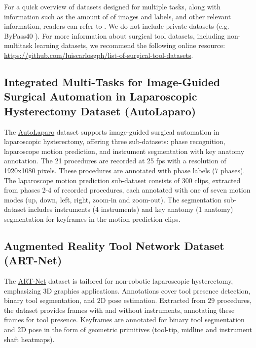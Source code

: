 For a quick overview of datasets designed for multiple tasks, along with information such as the amount of of images and labels, and other relevant information, readers can refer to .
We do not include private datasets (e.g. ByPass40 \citep{Ramesh2021_phase_step_gastric_bypass}). For more information about surgical tool datasets, including non-multitask learning datasets, we recommend the following online resource: \href{ https://github.com/luiscarlosgph/list-of-surgical-tool-datasets}{https://github.com/luiscarlosgph/list-of-surgical-tool-datasets}.   

\subsection{Integrated Multi-Tasks for
Image-Guided Surgical Automation in Laparoscopic Hysterectomy Dataset (AutoLaparo)}
The \href{https://autolaparo.github.io/}{AutoLaparo} dataset \citep{autolaparo} supports image-guided surgical automation in laparoscopic hysterectomy, offering three sub-datasets: phase recognition, laparoscope motion prediction, and instrument segmentation with key anatomy annotation. The 21 procedures are recorded at 25 fps with a resolution of 1920x1080 pixels. These procedures are annotated with phase labels (7 phases). The laparoscope motion prediction sub-dataset consists of 300 clips, extracted from phases 2-4 of recorded procedures, each annotated with one of seven motion modes (up, down, left, right, zoom-in and zoom-out). The segmentation sub-dataset includes instruments (4 instruments) and key anatomy (1 anatomy) segmentation for keyframes in the motion prediction clips.



\subsection{Augmented Reality Tool Network Dataset (ART-Net)}
The \href{https://github.com/kamruleee51/ART-Net}{ART-Net} dataset \citep{art_net} is tailored for non-robotic laparoscopic hysterectomy, emphasizing 3D graphics applications. Annotations cover tool presence detection, binary tool segmentation, and 2D pose estimation. Extracted from 29 procedures, the dataset provides frames with and without instruments, annotating these frames for tool presence. Keyframes are annotated for binary tool segmentation and 2D pose in the form of geometric primitives (tool-tip, midline and instrument shaft heatmaps).



